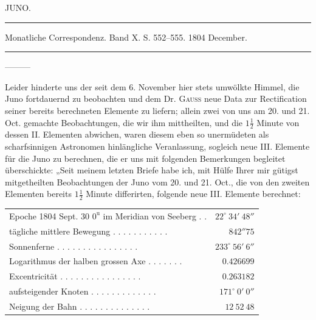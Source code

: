 \clearpage
{}
\hypertarget{native-263-lower}{}
\begin{center}
JUNO.

\rule{0.6\linewidth}{0.4pt}

Monatliche Correspondenz. Band X. S. 552–555. 1804 December.

\rule{0.6\linewidth}{0.4pt}
\end{center}

\noindent—\quad—\quad—\par

Leider hinderte uns der seit dem 6. November hier stets umwölkte Himmel, die Juno fortdauernd
zu beobachten und dem Dr. \textsc{Gauss} neue Data zur Rectification seiner bereits berechneten Elemente zu
liefern; allein zwei von uns am 20. und 21. Oct. gemachte Beobachtungen, die wir ihm mittheilten, und
die $1\frac{1}{2}$ Minute von dessen II. Elementen abwichen, waren diesem eben so unermüdeten als scharfsinnigen Astronomen hinlängliche Veranlassung, sogleich neue III. Elemente für die Juno zu berechnen, die
er uns mit folgenden Bemerkungen begleitet überschickte: „Seit meinem letzten Briefe habe ich, mit
Hülfe Ihrer mir gütigst mitgetheilten Beobachtungen der Juno vom 20. und 21. Oct., die von den zweiten Elementen bereits $1\frac{1}{2}$ Minute differirten, folgende neue III. Elemente berechnet:

\begin{center}
\begingroup\fontsize{8}{10}\selectfont\setlength{\tabcolsep}{3pt}\renewcommand{\arraystretch}{1.1}
\begin{tabular}{lr}
Epoche 1804 Sept. 30 $0^{\mathrm u}$ im Meridian von Seeberg . . & $22^\circ\ 34'\ 48''$ \\
tägliche mittlere Bewegung . . . . . . . . . . . & $842''75$ \\
Sonnenferne . . . . . . . . . . . . . . . . & $233^\circ\ 56'\ 6''$ \\
Logarithmus der halben grossen Axe . . . . . . . & $0.426699$ \\
Excentricität . . . . . . . . . . . . . . . . & $0.263182$ \\
aufsteigender Knoten . . . . . . . . . . . . . & $171^\circ\ 0'\ 0''$ \\
Neigung der Bahn . . . . . . . . . . . . . . & $12\ 52\ 48$ \\
\end{tabular}\endgroup
\end{center}

